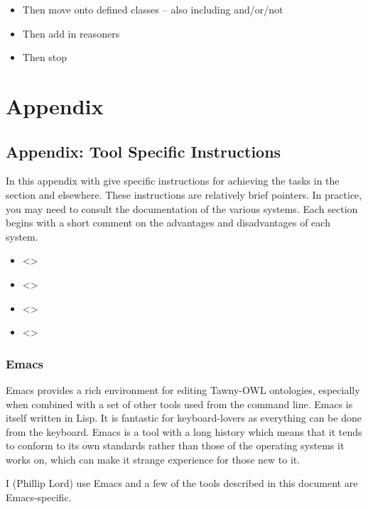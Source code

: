 \documentclass[11pt]{article}
\begin{document}
\begin{itemize}
\item Then move onto defined classes -- also including and/or/not
\item Then add in reasoners
\item Then stop
\end{itemize}




\section{Appendix}
\label{sec-6}

\subsection{Appendix: Tool Specific Instructions}
\label{sec-6-1}

In this appendix with give specific instructions for achieving the tasks
in the \label{/getting/started-Getting-Started} section and elsewhere. These
instructions are relatively brief pointers. In practice, you may need to
consult the documentation of the various systems. Each section begins
with a short comment on the advantages and disadvantages of each system.

\begin{itemize}
\item <>
\item <>
\item <>
\item <>
\end{itemize}

\subsubsection{Emacs}
\label{sec-6-1-1}

Emacs provides a rich environment for editing Tawny-OWL ontologies,
especially when combined with a set of other tools used from the command
line. Emacs is itself written in Lisp. It is fantastic for
keyboard-lovers as everything can be done from the keyboard. Emacs is a
tool with a long history which means that it tends to conform to its own
standards rather than those of the operating systems it works on, which
can make it strange experience for those new to it.

I (Phillip Lord) use Emacs and a few of the tools described in this
document are Emacs-specific.
\end{document}
